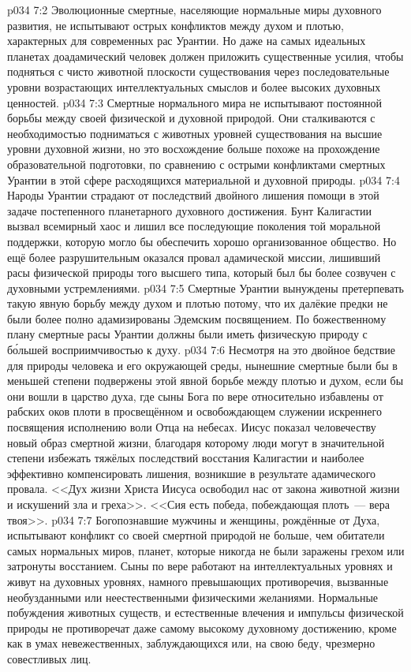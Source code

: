 \vs p034 7:2 Эволюционные смертные, населяющие нормальные миры духовного развития, не испытывают острых конфликтов между духом и плотью, характерных для современных рас Урантии. Но даже на самых идеальных планетах доадамический человек должен приложить существенные усилия, чтобы подняться с чисто животной плоскости существования через последовательные уровни возрастающих интеллектуальных смыслов и более высоких духовных ценностей.
\vs p034 7:3 Смертные нормального мира не испытывают постоянной борьбы между своей физической и духовной природой. Они сталкиваются с необходимостью подниматься с животных уровней существования на высшие уровни духовной жизни, но это восхождение больше похоже на прохождение образовательной подготовки, по сравнению с острыми конфликтами смертных Урантии в этой сфере расходящихся материальной и духовной природы.
\vs p034 7:4 \pc Народы Урантии страдают от последствий двойного лишения помощи в этой задаче постепенного планетарного духовного достижения. Бунт Калигастии вызвал всемирный хаос и лишил все последующие поколения той моральной поддержки, которую могло бы обеспечить хорошо организованное общество. Но ещё более разрушительным оказался провал адамической миссии, лишивший расы физической природы того высшего типа, который был бы более созвучен с духовными устремлениями.
\vs p034 7:5 Смертные Урантии вынуждены претерпевать такую явную борьбу между духом и плотью потому, что их далёкие предки не были более полно адамизированы Эдемским посвящением. По божественному плану смертные расы Урантии должны были иметь физическую природу с б\'ольшей восприимчивостью к духу.
\vs p034 7:6 \pc Несмотря на это двойное бедствие для природы человека и его окружающей среды, нынешние смертные были бы в меньшей степени подвержены этой явной борьбе между плотью и духом, если бы они вошли в царство духа, где сыны Бога по вере относительно избавлены от рабских оков плоти в просвещённом и освобождающем служении искреннего посвящения исполнению воли Отца на небесах. Иисус показал человечеству новый образ смертной жизни, благодаря которому люди могут в значительной степени избежать тяжёлых последствий восстания Калигастии и наиболее эффективно компенсировать лишения, возникшие в результате адамического провала. <<Дух жизни Христа Иисуса освободил нас от закона животной жизни и искушений зла и греха>>. <<Сия есть победа, побеждающая плоть~--- вера твоя>>.
\vs p034 7:7 Богопознавшие мужчины и женщины, рождённые от Духа, испытывают конфликт со своей смертной природой не больше, чем обитатели самых нормальных миров, планет, которые никогда не были заражены грехом или затронуты восстанием. Сыны по вере работают на интеллектуальных уровнях и живут на духовных уровнях, намного превышающих противоречия, вызванные необузданными или неестественными физическими желаниями. Нормальные побуждения животных существ, и естественные влечения и импульсы физической природы не противоречат даже самому высокому духовному достижению, кроме как в умах невежественных, заблуждающихся или, на свою беду, чрезмерно совестливых лиц.
